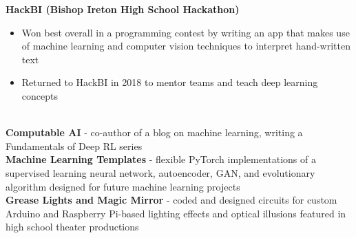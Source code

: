 \documentclass{article}
\begin{document}
\begin{center}
\begin{flushleft}
    \textbf{HackBI  (Bishop Ireton High School Hackathon)}

    \begin{itemize}
      \item Won best overall in a programming contest by writing an app that makes use of machine learning and computer vision techniques to interpret hand-written text
      \item Returned to HackBI in 2018 to mentor teams and teach deep learning concepts
    \end{itemize}

    {\large\textbf{\underline{}}} \\
    \textbf{Computable AI} - co-author of a blog on machine learning, writing a Fundamentals of Deep RL series \\
    \textbf{Machine Learning Templates} - flexible PyTorch implementations of a supervised learning neural network, autoencoder, GAN, and evolutionary algorithm designed for future machine learning projects \\
    \textbf{Grease Lights and Magic Mirror} - coded and designed circuits for custom Arduino and Raspberry Pi-based lighting effects and optical illusions featured in high school theater productions


  \end{flushleft}
  \end{center}
\end{document}
